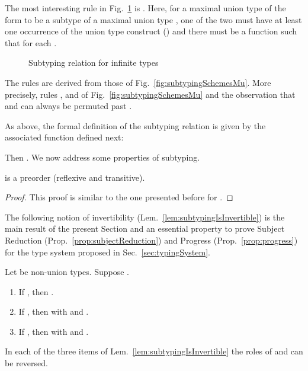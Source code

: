 The most interesting rule in Fig.~\ref{fig:subtypingSchemesCo} is
. Here, for a maximal union type of the form  to be a subtype of a maximal union type , one of the two must have at least one occurrence of the union
type construct () and there must be a function 
such that  for each . 

\begin{figure}[t] 
\caption{Subtyping relation for infinite types}
\label{fig:subtypingSchemesCo}
\end{figure}


\begin{remark}
The rules are derived from those of Fig.~\ref{fig:subtypingSchemesMu}. More
precisely, rules ,  and
 of Fig.~\ref{fig:subtypingSchemesMu} and the observation
that  and  can always be permuted past
.
\end{remark}

As above, the formal definition of the subtyping relation is given by the
associated function  defined next: 

Then . We now address some properties
of subtyping.

\begin{lemma}
 is a preorder (\ie reflexive and transitive).
\end{lemma}

\begin{proof}
This proof is similar to the one presented before for .
\end{proof}



The following notion of invertibility (Lem.~\ref{lem:subtypingIsInvertible}) is
the main result of the present Section and an essential property to prove
Subject Reduction (Prop.~\ref{prop:subjectReduction}) and Progress
(Prop.~\ref{prop:progress}) for the type system proposed in
Sec.~\ref{sec:typingSystem}.

\begin{lemma}
\label{lem:subtypingIsInvertible}
Let  be non-union types. Suppose .
\begin{enumerate}
  \item If , then .
  \item If , then 
  with  and .
  \item If , then 
  with  and .
\end{enumerate}
\end{lemma}

\begin{remark}
In each of the three items of Lem.~\ref{lem:subtypingIsInvertible} the roles of
 and  can be reversed. 
\end{remark}





